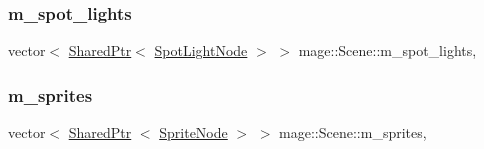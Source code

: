 \subsubsection{\texorpdfstring{m\+\_\+spot\+\_\+lights}{m\_spot\_lights}}
{\footnotesize\ttfamily vector$<$ \hyperlink{namespacemage_a1e01ae66713838a7a67d30e44c67703e}{Shared\+Ptr}$<$ \hyperlink{namespacemage_aeed5dee4ff6c591eabb0e9114256df4a}{Spot\+Light\+Node} $>$ $>$ mage\+::\+Scene\+::m\+\_\+spot\+\_\+lights\hspace{0.3cm}{\ttfamily [mutable]}, {\ttfamily [private]}}

\hypertarget{classmage_1_1_scene_a2d68edf08b57dde36ec7cf1f5a91d281}{}\label{classmage_1_1_scene_a2d68edf08b57dde36ec7cf1f5a91d281} 
\subsubsection{\texorpdfstring{m\+\_\+sprites}{m\_sprites}}
{\footnotesize\ttfamily vector$<$ \hyperlink{namespacemage_a1e01ae66713838a7a67d30e44c67703e}{Shared\+Ptr} $<$ \hyperlink{classmage_1_1_sprite_node}{Sprite\+Node} $>$ $>$ mage\+::\+Scene\+::m\+\_\+sprites\hspace{0.3cm}{\ttfamily [mutable]}, {\ttfamily [private]}}


